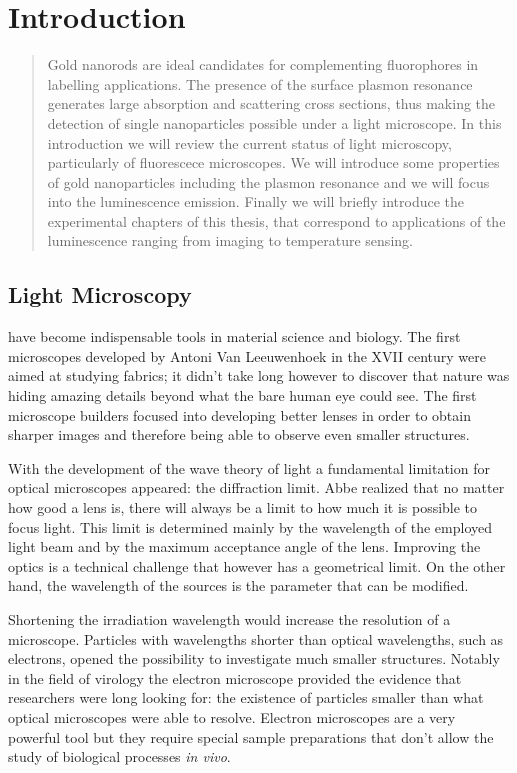 \chapter{Introduction}
\label{chapter_1}

\begin{abstract}
Gold nanorods are ideal candidates for complementing fluorophores in labelling
applications. The presence of the surface plasmon resonance generates large
absorption and scattering cross sections, thus making the detection of single
nanoparticles possible under a light microscope. In this introduction we will
review the current status of light microscopy, particularly of fluorescece
microscopes. We will introduce some properties of gold nanoparticles including
the plasmon resonance and we will focus into the luminescence emission.
Finally we will briefly introduce the experimental chapters of this
thesis, that correspond to applications of the luminescence ranging from imaging to
temperature sensing.
\end{abstract}

\newpage

\section{Light Microscopy}
 have become indispensable tools in material science and
biology. The first microscopes developed by Antoni Van Leeuwenhoek in the XVII
century were aimed at studying fabrics; it didn't take long however to discover
that nature was hiding amazing details beyond what the bare human eye could
see. The first microscope builders focused into developing better lenses in
order to obtain sharper images and therefore being able to observe even smaller
structures. 

With the development of the wave theory of light a fundamental limitation for
optical microscopes appeared: the diffraction limit. Abbe realized that no
matter how good a lens is, there will always be a limit to how much it is
possible to focus light. This limit is determined mainly by the wavelength of
the employed light beam and by the maximum acceptance angle of the lens.
Improving the optics is a technical challenge that however has a geometrical
limit. On the other hand, the wavelength of the sources is the parameter that
can be modified.

Shortening the irradiation wavelength would increase the resolution of a
microscope. Particles with wavelengths shorter than optical wavelengths, such as
electrons, opened the possibility to investigate much smaller
structures\cite{Kausche1939}. Notably in the field of virology the electron
microscope provided the evidence that researchers were long looking for: the
existence of particles smaller than what optical microscopes were able to
resolve. Electron microscopes are a very powerful tool but they require special
sample preparations that don't allow the study of biological processes
\textit{in vivo}.

